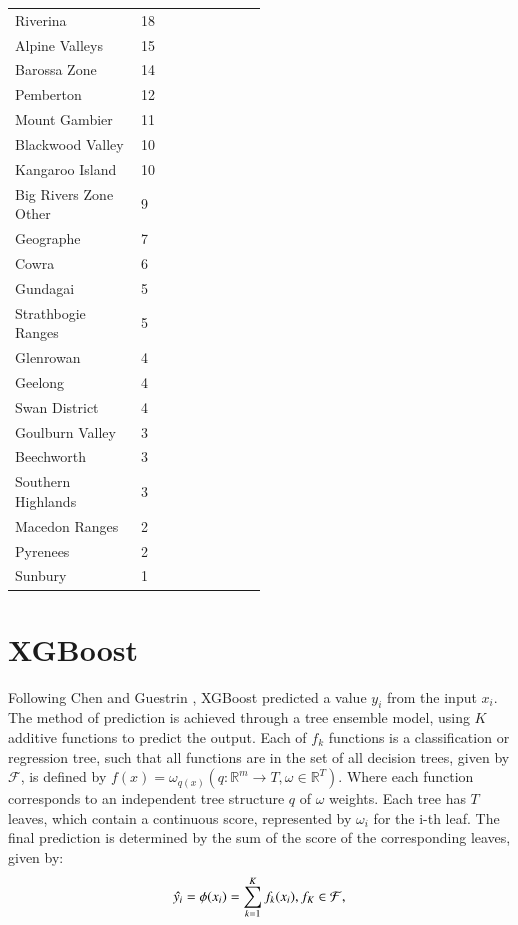 \documentclass[review,12pt,authoryear]{elsarticle}
\begin{document}
\begin{linenumbers}
\begin{center}
\begin{longtable}{p{0.5\linewidth} p{.35\linewidth}}
  Riverina & 18 \\
  Alpine Valleys & 15 \\
  Barossa Zone & 14 \\
  Pemberton & 12 \\
  Mount Gambier & 11 \\
  Blackwood Valley & 10 \\
  Kangaroo Island & 10 \\
  Big Rivers Zone Other & 9 \\
  Geographe & 7 \\
  Cowra & 6 \\
  Gundagai & 5 \\
  Strathbogie Ranges & 5 \\
  Glenrowan & 4 \\
  Geelong & 4 \\
  Swan District & 4 \\
  Goulburn Valley & 3 \\
  Beechworth & 3 \\
  Southern Highlands & 3 \\
  Macedon Ranges & 2 \\
  Pyrenees & 2 \\
  Sunbury & 1 \\ \bottomrule
\end{longtable}
\end{center}
\clearpage

\section{XGBoost}
Following Chen and Guestrin \citep{chenXGBoostScalableTree2016}, XGBoost predicted a value $y_i$ from the input $x_i$. The method of prediction is achieved through a tree ensemble model, using $K$ additive functions to predict the output. Each of $f_k$ functions is a classification or regression tree, such that all functions are in the set of all decision trees, given by $\mathcal{F}$, is defined by ${f(x) = \omega_{q(x)}}(q : \mathbb{R}^m \rightarrow T, \omega \in \mathbb{R}^T)$. Where each function corresponds to an independent tree structure $q$ of $\omega$ weights. Each tree has $T$ leaves, which contain a continuous score, represented by $\omega_i$ for the i-th leaf. The final prediction is determined by the sum of the score of the corresponding leaves, given by:
\begin{equation}
 \hat{y_i}=\phi(x_i)=\sum_{k=1}^{K}{f_{k}(x_{i})}, \space f_{K}\in \mathcal{F},
\end{equation}


\end{linenumbers}
\end{document}
